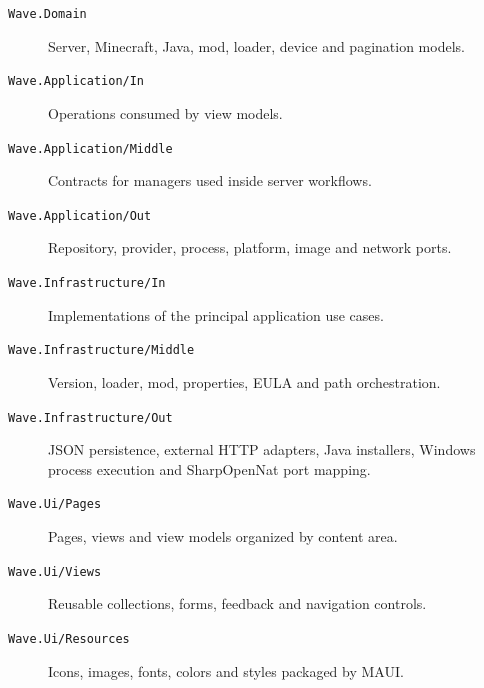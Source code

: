 \begin{description}
  \item[\texttt{Wave.Domain}] Server, Minecraft, Java, mod, loader, device and pagination models.
  \item[\texttt{Wave.Application/In}] Operations consumed by view models.
  \item[\texttt{Wave.Application/Middle}] Contracts for managers used inside server workflows.
  \item[\texttt{Wave.Application/Out}] Repository, provider, process, platform, image and network ports.
  \item[\texttt{Wave.Infrastructure/In}] Implementations of the principal application use cases.
  \item[\texttt{Wave.Infrastructure/Middle}] Version, loader, mod, properties, EULA and path orchestration.
  \item[\texttt{Wave.Infrastructure/Out}] JSON persistence, external HTTP adapters, Java installers, Windows process execution and SharpOpenNat port mapping.
  \item[\texttt{Wave.Ui/Pages}] Pages, views and view models organized by content area.
  \item[\texttt{Wave.Ui/Views}] Reusable collections, forms, feedback and navigation controls.
  \item[\texttt{Wave.Ui/Resources}] Icons, images, fonts, colors and styles packaged by MAUI.
\end{description}
